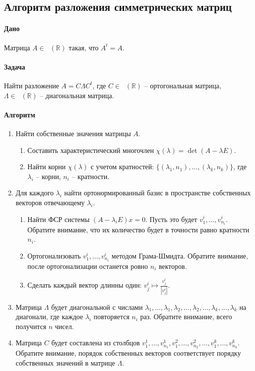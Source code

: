 \documentclass{article}
\newcommand{\Matrix}[2]{\mathop{\mathrm{M}_{#2}}(#1)}
\begin{document}
\subsection{Алгоритм разложения симметрических матриц}


\paragraph{Дано} Матрица $A\in\Matrix{\mathbb R}{n}$ такая, что $A^t = A$.

\paragraph{Задача} Найти разложение $A = C \Lambda C^t$, где $C\in\Matrix{\mathbb R}{n}$ -- ортогональная матрица, $\Lambda\in\Matrix{\mathbb R}{n}$ -- диагональная матрица.

\paragraph{Алгоритм}
\begin{enumerate}
\item Найти собственные значения матрицы $A$. 
\begin{enumerate}
\item Составить характеристический многочлен $\chi(\lambda) = \det(A-\lambda E)$.
\item Найти корни $\chi(\lambda)$ с учетом кратностей: $\{(\lambda_1, n_1),\ldots,(\lambda_k, n_k)\}$, где $\lambda_i$ -- корни, $n_i$ -- кратности.
\end{enumerate}

\item Для каждого $\lambda_i$ найти ортонормированный базис в пространстве собственных векторов отвечающему $\lambda_i$.
\begin{enumerate}
\item Найти ФСР системы $(A-\lambda_i E)x = 0$. Пусть это будет $v^i_1,\ldots,v^i_{n_i}$. Обратите внимание, что их количество будет в точности равно кратности $n_i$.

\item Ортогонализовать $v^i_1,\ldots,v^i_{n_i}$ методом Грама-Шмидта. Обратите внимание, после ортогонализации останется ровно $n_i$ векторов.

\item Сделать каждый вектор длинны один: $v^i_j\mapsto \frac{v^i_j}{|v^i_j|}$.
\end{enumerate}

\item Матрица $\Lambda$ будет диагональной с числами $\lambda_1,\ldots,\lambda_1,\lambda_2,\ldots,\lambda_2,\ldots,\lambda_k,\ldots,\lambda_k$ на диагонали, где каждое $\lambda_i$ повторяется $n_i$ раз. Обратите внимание, всего получится $n$ чисел.

\item Матрица $C$ будет составлена из столбцов $v^1_1,\ldots,v^1_{n_1}, v^2_1,\ldots,v^2_{n_2},\ldots,v^k_1,\ldots,v^k_{n_k}$. Обратите внимание, порядок собственных векторов соответствует порядку собственных значений в матрице $\Lambda$.
\end{enumerate}
\end{document}
